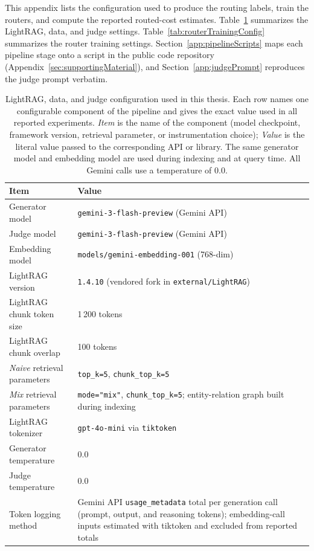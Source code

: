\documentclass[english, bibtex]{kththesis}               %
\numberwithin{listing}{chapter}
\begin{document}
This appendix lists the configuration used to produce the routing labels, train the routers, and compute the reported routed-cost estimates. Table~\ref{tab:lightragDataJudgeConfig} summarizes the LightRAG, data, and judge settings. Table~\ref{tab:routerTrainingConfig} summarizes the router training settings. Section~\ref{app:pipelineScripts} maps each pipeline stage onto a script in the public code repository (Appendix~\ref{sec:supportingMaterial}), and Section~\ref{app:judgePrompt} reproduces the judge prompt verbatim.

\begin{table}[!ht]
\centering
\caption{LightRAG, data, and judge configuration used in this thesis. Each row names one configurable component of the pipeline and gives the exact value used in all reported experiments. \emph{Item} is the name of the component (model checkpoint, framework version, retrieval parameter, or instrumentation choice); \emph{Value} is the literal value passed to the corresponding API or library. The same generator model and embedding model are used during indexing and at query time. All Gemini calls use a temperature of $0.0$.}
\label{tab:lightragDataJudgeConfig}
\begin{tabularx}{\textwidth}{p{}|X}
\textbf{Item} & \textbf{Value} \\
\hline
Generator model & \texttt{gemini-3-flash-preview} (Gemini API) \\
Judge model & \texttt{gemini-3-flash-preview} (Gemini API) \\
Embedding model & \texttt{models/gemini-embedding-001} (768-dim) \\
LightRAG version & \texttt{1.4.10} (vendored fork in \texttt{external/LightRAG}) \\
LightRAG chunk token size & 1\,200 tokens \\
LightRAG chunk overlap & 100 tokens \\
\emph{Naive} retrieval parameters & \texttt{top\_k=5}, \texttt{chunk\_top\_k=5} \\
\emph{Mix} retrieval parameters & \texttt{mode="mix"}, \texttt{chunk\_top\_k=5}; entity-relation graph built during indexing \\
LightRAG tokenizer & \texttt{gpt-4o-mini} via \texttt{tiktoken} \\
Generator temperature & 0.0 \\
Judge temperature & 0.0 \\
Token logging method & Gemini API \texttt{usage\_metadata} total per generation call (prompt, output, and reasoning tokens); embedding-call inputs estimated with tiktoken and excluded from reported totals \\

\end{tabularx}
\end{table}
\end{document}
